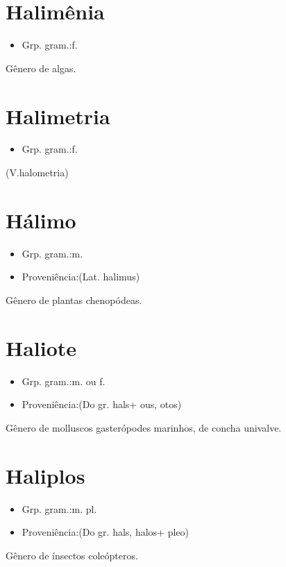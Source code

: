 \documentclass{article}
\begin{document}
\section{Halimênia}
\begin{itemize}
\item {Grp. gram.:f.}
\end{itemize}
Gênero de algas.
\section{Halimetria}
\begin{itemize}
\item {Grp. gram.:f.}
\end{itemize}
(V.halometria)
\section{Hálimo}
\begin{itemize}
\item {Grp. gram.:m.}
\end{itemize}
\begin{itemize}
\item {Proveniência:(Lat. \textunderscore halimus\textunderscore )}
\end{itemize}
Gênero de plantas chenopódeas.
\section{Haliote}
\begin{itemize}
\item {Grp. gram.:m.  ou  f.}
\end{itemize}
\begin{itemize}
\item {Proveniência:(Do gr. \textunderscore hals\textunderscore  + \textunderscore ous\textunderscore , \textunderscore otos\textunderscore )}
\end{itemize}
Gênero de molluscos gasterópodes marinhos, de concha univalve.
\section{Haliplos}
\begin{itemize}
\item {Grp. gram.:m. pl.}
\end{itemize}
\begin{itemize}
\item {Proveniência:(Do gr. \textunderscore hals\textunderscore , \textunderscore halos\textunderscore  + \textunderscore pleo\textunderscore )}
\end{itemize}
Gênero de ínsectos coleópteros.
\end{document}
